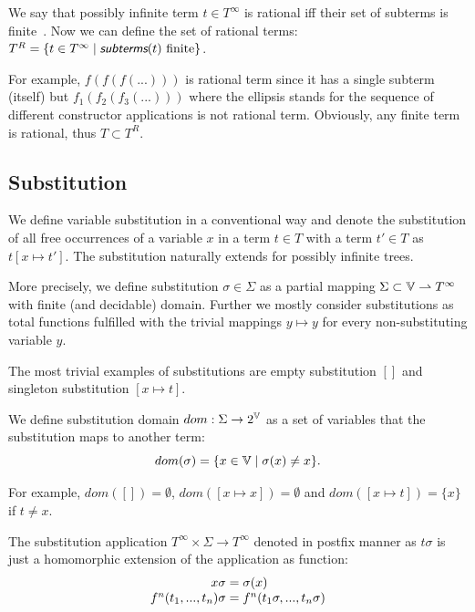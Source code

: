 We say that possibly infinite term $t \in T^\infty$ is rational iff their set of subterms is finite~\cite{colmerauer1982prolog}. Now we can define the set of rational terms: $T^R = \{ t \in T^\infty \mid \subterms(t) \text{ finite}\}$.

For example, $f(f(f(...)))$ is rational term since it has a single subterm (itself) but $f_1(f_2(f_3(...)))$ where the ellipsis stands for the sequence of different constructor applications is not rational term. Obviously, any finite term is rational, thus $T \subset T^R$.


\subsection{Substitution}

We define variable substitution in a conventional way and denote the substitution of all free occurrences of a variable $x$ in a term $t \in T$ with a term $t' \in T$ as $t [x \mapsto t']$. The substitution naturally extends for possibly infinite trees.

More precisely, we define substitution $\sigma \in \Sigma$ as a partial mapping $\Sigma \subset \mathbb{V} \rightharpoonup T^\infty$ with finite (and decidable) domain. Further we mostly consider substitutions as total functions fulfilled with the trivial mappings $y \mapsto y$ for every non-substituting variable $y$.

The most trivial examples of substitutions are empty substitution $[]$ and singleton substitution $[x \mapsto t]$.

We define substitution domain $dom : \Sigma \rightarrow 2^{\mathbb{V}}$ as a set of variables that the substitution maps to another term:
\[dom(\sigma) = \{ x \in \mathbb{V} \mid \sigma(x) \neq x \}.\]

For example, $dom([]) = \emptyset$, $dom([x \mapsto x]) = \emptyset$ and $dom([x \mapsto t]) = \{ x \}$ if $t \neq x$.

The substitution application $T^\infty \times \Sigma \rightarrow T^\infty$ denoted in postfix manner as $t \sigma$ is just a homomorphic extension of the application as function:
\begin{equation*}
    \begin{array}{r@{{}={}}l}
        x\sigma & \sigma(x) \\
        f^n(t_1, ..., t_n) \sigma & f^n(t_1\sigma, ..., t_n \sigma) \\
    \end{array}
\end{equation*}

